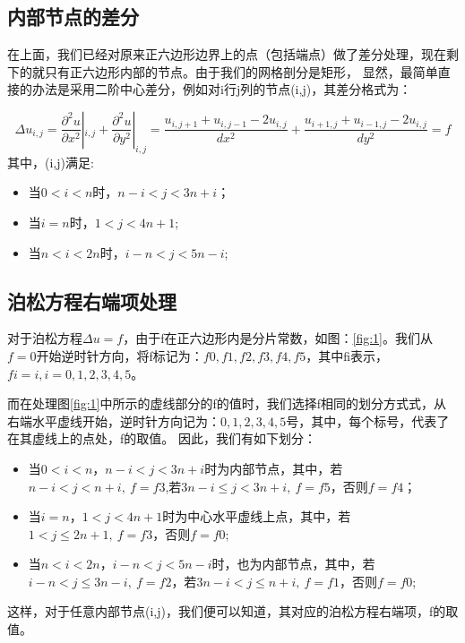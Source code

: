 \documentclass[a4paper,11pt]{ctexart} %
\begin{document}
\subsection{内部节点的差分}
在上面，我们已经对原来正六边形边界上的点（包括端点）做了差分处理，现在剩下的就只有正六边形内部的节点。由于我们的网格剖分是矩形，
显然，最简单直接的办法是采用二阶中心差分，例如对i行j列的节点(i,j)，其差分格式为：\par
\begin{equation}
\label{eq:4}
\Delta u_{i,j}=\frac{\partial^2 u}{\partial x^2}|_{i,j}+\frac{\partial^2 u}{\partial y^2 }|_{i,j}=\frac{u_{i,j+1}+u_{i,j-1}-2u_{i,j}}{dx^2}+\frac{u_{i+1,j}+u_{i-1,j}-2u_{i,j}}{dy^2}=f
\end{equation}
其中，(i,j)满足:\par
\begin{itemize}
\item 当$0<i<n$时，$n-i<j<3n+i$；
\item 当$i=n$时，$1<j<4n+1$;
\item 当$n<i<2n$时，$i-n<j<5n-i$;
\end{itemize}
\subsection{泊松方程右端项处理}
对于泊松方程$\Delta u=f$，由于f在正六边形内是分片常数，如图：\ref{fig:1}。我们从$f=0$开始逆时针方向，将f标记为：$f0,f1,f2,f3,f4,f5$，其中fi表示，$fi=i,i=0,1,2,3,4,5$。\par
而在处理图\ref{fig:1}中所示的虚线部分的f的值时，我们选择f相同的划分方式式，从右端水平虚线开始，逆时针方向记为：$0,1,2,3,4,5$号，其中，每个标号，代表了在其虚线上的点处，f的取值。
因此，我们有如下划分：\par
\begin{itemize}
\item 当$0<i<n$，$n-i<j<3n+i$时为内部节点，其中，若$n-i<j<n+i,\ f=f3 $,若$3n-i\leq j<3n+i,\ f=f5 $，否则$f=f4$；
\item 当$i=n$，$1<j<4n+1$时为中心水平虚线上点，其中，若$1<j\leq 2n+1,\ f=f3$，否则$f=f0$;
\item 当$n<i<2n$，$i-n<j<5n-i$时，也为内部节点，其中，若$i-n<j\leq 3n-i,\ f=f2$，若$3n-i<j\leq n+i,\ f=f1$，否则$f=f0$;
\end{itemize}
这样，对于任意内部节点(i,j)，我们便可以知道，其对应的泊松方程右端项，f的取值。
\end{document}
